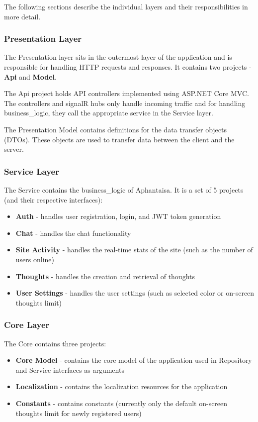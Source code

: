 The following sections describe the individual layers and their responsibilities in more detail.

\subsubsection*{Presentation Layer}
The Presentation layer sits in the outermost layer of the application and is responsible for handling HTTP requests and responses.
It contains two projects - \textbf{Api} and \textbf{Model}.

The Api project holds API controllers implemented using ASP.NET Core MVC.
The controllers and signalR hubs only handle incoming traffic and  
for handling \gls{business_logic}, they call the appropriate service in the Service layer.

The Presentation Model contains definitions for the data transfer objects (DTOs).
These objects are used to transfer data between the client and the server.

\subsubsection*{Service Layer}
The Service contains the \gls{business_logic} of Aphantaisa.
It is a set of 5 projects (and their respective interfaces):
\begin{itemize}
    \item \textbf{Auth} - handles user registration, login, and JWT token generation
    \item \textbf{Chat} - handles the chat functionality
    \item \textbf{Site Activity} - handles the real-time stats of the site (such as the number of users online)
    \item \textbf{Thoughts} - handles the creation and retrieval of thoughts
    \item \textbf{User Settings} - handles the user settings (such as selected color or on-screen thoughts limit)
\end{itemize}

\subsubsection*{Core Layer}
The Core contains three projects:
\begin{itemize}
    \item \textbf{Core Model} - contains the core model of the application used in Repository and Service interfaces as arguments
    \item \textbf{Localization} - contains the localization resources for the application
    \item \textbf{Constants} - contains constants (currently only the default on-screen thoughts limit for newly registered users)
\end{itemize}

